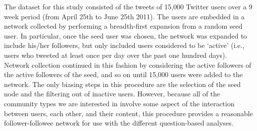 The dataset for this study consisted of the tweets of 15,000 Twitter users over a 9 week period (from April 25th to June 25th 2011). The users are embedded in a network collected by performing a breadth-first expansion from a random seed user. In particular, once the seed user was chosen, the network was expanded to include his/her followers, but only included users considered to be `active' (i.e., users who tweeted at least once per day over the past one hundred days). Network collection continued in this fashion by considering the active followers of the active followers of the seed, and so on until 15,000 users were added to the network. The only biasing steps in this procedure are the selection of the seed node and the filtering out of inactive users. However, because all of the community types we are interested in involve some aspect of the interaction between users, each other, and their content, this procedure provides a reasonable follower-followee network for use with the different question-based analyses.


